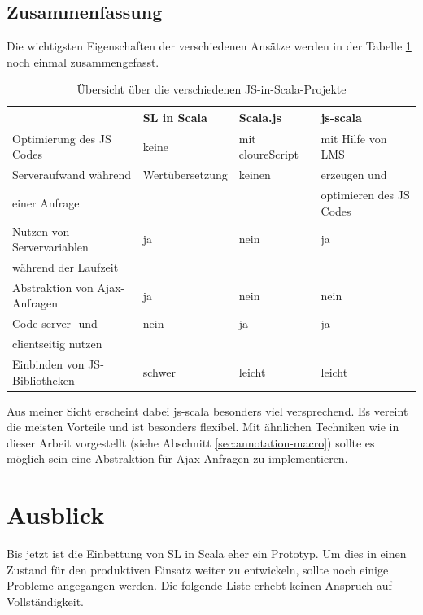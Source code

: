 \documentclass[12pt,bibtotoc]{scrreprt}
\begin{document}
\section{Zusammenfassung}

Die wichtigsten Eigenschaften der verschiedenen Ansätze werden in der Tabelle \ref{tab:related-work-overview} noch einmal zusammengefasst.

\begin{table}[ht]
\caption{Übersicht über die verschiedenen JS-in-Scala-Projekte}
\centering
\begin{tabular}{llll}
      & SL in Scala &  Scala.js              &    js-scala \\
\midrule
Optimierung des JS Codes  &  keine  &  mit cloureScript & mit Hilfe von LMS\\
\addlinespace
Serveraufwand während & Wertübersetzung & keinen & erzeugen und  \\
einer Anfrage &  & & optimieren des JS Codes\\
\addlinespace
Nutzen von Servervariablen  & ja & nein & ja \\
während der Laufzeit & \\
\addlinespace
Abstraktion von Ajax-Anfragen & ja & nein & nein \\
\addlinespace
Code server- und & nein & ja & ja \\
clientseitig nutzen \\
\addlinespace
Einbinden von JS-Bibliotheken & schwer & leicht & leicht \\

\end{tabular}
\label{tab:related-work-overview}
\end{table}

Aus meiner Sicht erscheint dabei js-scala besonders viel versprechend. Es vereint die meisten Vorteile und ist besonders flexibel. Mit ähnlichen Techniken wie in dieser Arbeit vorgestellt (siehe Abschnitt \ref{sec:annotation-macro}) sollte es möglich sein eine Abstraktion für Ajax-Anfragen zu implementieren.

\chapter{Ausblick}
\label{sec:future-works}

Bis jetzt ist die Einbettung von SL in Scala eher ein Prototyp. Um dies in einen Zustand für den produktiven Einsatz weiter zu entwickeln, sollte noch einige Probleme angegangen werden. Die folgende Liste erhebt keinen Anspruch auf Vollständigkeit. 
\end{document}
